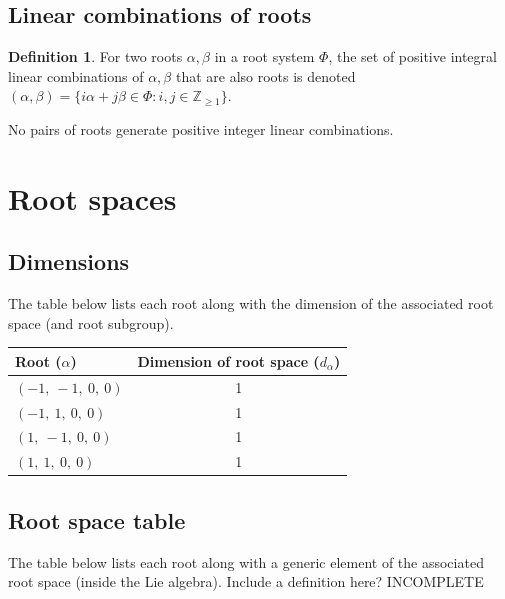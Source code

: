 \documentclass[11pt]{article}
\newcommand{\noi}{\noindent}
\theoremstyle{definition}
\newtheorem{definition}{Definition}[section]
\begin{document}
\subsection{Linear combinations of roots}

\begin{definition}
For two roots $\alpha, \beta$ in a root system $\Phi$, the set of positive integral linear combinations of $\alpha, \beta$ that are also roots is denoted
\(
	(\alpha, \beta) = \{ i \alpha + j \beta \in \Phi : i, j \in \mathbb{Z}_{\ge 1} \}
\).
\end{definition}

\noindent No pairs of roots generate positive integer linear combinations.


\newpage
\section{Root spaces}

\subsection{Dimensions}

The table below lists each root along with the dimension of the associated root space (and root subgroup).

\bigskip

\noindent \begin{tabular}{|l|c|}
    \hline
    \textbf{Root ($\alpha$)} & \textbf{Dimension of root space ($d_{\alpha}$)} \\
    \hline
    $\left( -1, \  -1, \  0, \  0\right)$ & 1 \\
    \hline
    $\left( -1, \  1, \  0, \  0\right)$ & 1 \\
    \hline
    $\left( 1, \  -1, \  0, \  0\right)$ & 1 \\
    \hline
    $\left( 1, \  1, \  0, \  0\right)$ & 1 \\
    \hline
\end{tabular}


\subsection{Root space table}

\noi The table below lists each root along with a generic element of the associated root space (inside the Lie algebra). Include a definition here? INCOMPLETE

\bigskip
\end{document}
